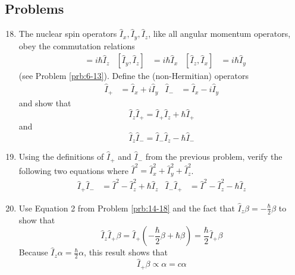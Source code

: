 \documentclass[../notes.tex]{subfiles}
\begin{document}
\subsection*{Problems}
\begin{enumerate}[label={\textbf{14-\arabic*.}},ref={14-\arabic*}]
    \setcounter{enumi}{17}
    \item \label{prb:14-18}The nuclear spin operators $\hat{I}_x,\hat{I}_y,\hat{I}_z$, like all angular momentum operators, obey the commutation relations
    \begin{align*}
        [\hat{I}_x,\hat{I}_y] &= i\hbar\hat{I}_z&
        [\hat{I}_y,\hat{I}_z] &= i\hbar\hat{I}_x&
        [\hat{I}_z,\hat{I}_x] &= i\hbar\hat{I}_y
    \end{align*}
    (see Problem \ref{prb:6-13}). Define the (non-Hermitian) operators
    \begin{align*}
        \hat{I}_+ &= \hat{I}_x+i\hat{I}_y&
        \hat{I}_- &= \hat{I}_x-i\hat{I}_y\tag{1}
    \end{align*}
    and show that
    \begin{equation*}
        \hat{I}_z\hat{I}_+ = \hat{I}_+\hat{I}_z+\hbar\hat{I}_+\tag{2}
    \end{equation*}
    and
    \begin{equation*}
        \hat{I}_z\hat{I}_- = \hat{I}_-\hat{I}_z-\hbar\hat{I}_-\tag{3}
    \end{equation*}
    \item \label{prb:14-19}Using the definitions of $\hat{I}_+$ and $\hat{I}_-$ from the previous problem, verify the following two equations where $\hat{I}^2=\hat{I}_x^2+\hat{I}_y^2+\hat{I}_z^2$.
    \begin{align*}
        \hat{I}_+\hat{I}_- &= \hat{I}^2-\hat{I}_z^2+\hbar\hat{I}_z&
        \hat{I}_-\hat{I}_+ &= \hat{I}^2-\hat{I}_z^2-\hbar\hat{I}_z
    \end{align*}
    \item \label{prb:14-20}Use Equation 2 from Problem \ref{prb:14-18} and the fact that $\hat{I}_z\beta=-\frac{\hbar}{2}\beta$ to show that
    \begin{equation*}
        \hat{I}_z\hat{I}_+\beta = \hat{I}_+\left( -\frac{\hbar}{2}\beta+\hbar\beta \right) = \frac{\hbar}{2}\hat{I}_+\beta
    \end{equation*}
    Because $\hat{I}_z\alpha=\frac{\hbar}{2}\alpha$, this result shows that
    \begin{equation*}
        \hat{I}_+\beta \propto \alpha = c\alpha
    \end{equation*}

\end{enumerate}
\end{document}
